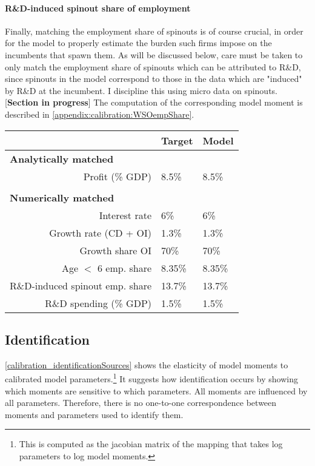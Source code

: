 \documentclass[11pt,english]{article}
\begin{document}
 
\paragraph{R\&D-induced spinout share of employment}

Finally, matching the employment share of spinouts is of course crucial, in order for the model to properly estimate the burden such firms impose on the incumbents that spawn them. As will be discussed below, care must be taken to only match the employment share of spinouts which can be attributed to R\&D, since spinouts in the model correspond to those in the data which are "induced" by R\&D at the incumbent. I discipline this using micro data on spinouts. [\textbf{Section in progress}] The computation of the corresponding model moment is described in \ref{appendix:calibration:WSOempShare}.



\begin{table}[]
	\centering
	\label{calibration_targets}
	\begin{tabular}{rll}
		\toprule \toprule
		& Target & Model \tabularnewline
		\midrule
		\multicolumn{1}{l}{\textbf{Analytically matched}} & & 
		\tabularnewline
		Profit (\% GDP) & 8.5\% & 8.5\% 
		\tabularnewline
		\tabularnewline
		\multicolumn{1}{l}{\textbf{Numerically matched}} & & 
		\tabularnewline
		Interest rate & 6\% & 6\% 
		\tabularnewline
		Growth rate (CD + OI) & 1.3\% & 1.3\%
		\tabularnewline		
		Growth share OI & 70\% & 70\%
		\tabularnewline
		Age $<$ 6 emp. share  & 8.35\% & 8.35\%
		\tabularnewline
		R\&D-induced spinout emp. share & 13.7\% & 13.7\%
		\tabularnewline
		R\&D spending (\% GDP) & 1.5\% & 1.5\%
		\tabularnewline
		\bottomrule
	\end{tabular}
\end{table}

\normalsize

\subsection{Identification}

\autoref{calibration_identificationSources} shows the elasticity of model moments to calibrated model parameters.\footnote{This is computed as the jacobian matrix of the mapping that takes log parameters to log model moments.} It suggests how identification occurs by showing which moments are sensitive to which parameters. All moments are influenced by all parameters. Therefore, there is no one-to-one correspondence between moments and parameters used to identify them. 
\end{document}
